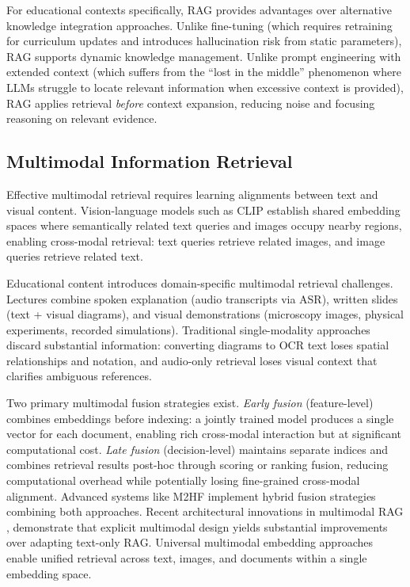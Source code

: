\documentclass[11pt,a4paper,twocolumn]{article}
\begin{document}
For educational contexts specifically, RAG provides advantages over alternative knowledge integration approaches. Unlike fine-tuning (which requires retraining for curriculum updates and introduces hallucination risk from static parameters), RAG supports dynamic knowledge management. Unlike prompt engineering with extended context (which suffers from the ``lost in the middle'' phenomenon where LLMs struggle to locate relevant information when excessive context is provided), RAG applies retrieval \textit{before} context expansion, reducing noise and focusing reasoning on relevant evidence.

\subsection{Multimodal Information Retrieval}

Effective multimodal retrieval requires learning alignments between text and visual content. Vision-language models such as CLIP \cite{radford2021clip} establish shared embedding spaces where semantically related text queries and images occupy nearby regions, enabling cross-modal retrieval: text queries retrieve related images, and image queries retrieve related text.

Educational content introduces domain-specific multimodal retrieval challenges. Lectures combine spoken explanation (audio transcripts via ASR), written slides (text + visual diagrams), and visual demonstrations (microscopy images, physical experiments, recorded simulations). Traditional single-modality approaches discard substantial information: converting diagrams to OCR text loses spatial relationships and notation, and audio-only retrieval loses visual context that clarifies ambiguous references.

Two primary multimodal fusion strategies exist. \textit{Early fusion} (feature-level) combines embeddings before indexing: a jointly trained model produces a single vector for each document, enabling rich cross-modal interaction but at significant computational cost. \textit{Late fusion} (decision-level) maintains separate indices and combines retrieval results post-hoc through scoring or ranking fusion, reducing computational overhead while potentially losing fine-grained cross-modal alignment. Advanced systems like M2HF \cite{liu2022m2hf} implement hybrid fusion strategies combining both approaches. Recent architectural innovations in multimodal RAG \cite{hu2025mrag}, \cite{liu2025hmrag} demonstrate that explicit multimodal design yields substantial improvements over adapting text-only RAG. Universal multimodal embedding approaches \cite{lin2024mmembed} enable unified retrieval across text, images, and documents within a single embedding space.
\end{document}
